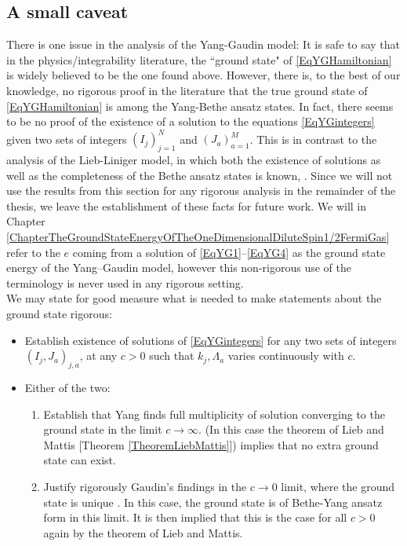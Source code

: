 \subsection{A small caveat}\label{SubsectionYGCaveat}
There is one issue in the analysis of the Yang-Gaudin model: It is safe to say that in the physics/integrability literature, the ``ground state" of \eqref{EqYGHamiltonian} is widely believed to be the one found above. However, there is, to the best of our knowledge, no rigorous proof in the literature that the true ground state of \eqref{EqYGHamiltonian} is among the Yang-Bethe ansatz states. In fact, there seems to be no proof of the existence of a solution to the equations \eqref{EqYGintegers} given two sets of integers $ (I_j)_{j=1}^{N} $ and $ (J_a)_{a=1}^{M} $. This is in contrast to the analysis of the Lieb-Liniger model, in which both the existence of solutions as well as the completeness of the Bethe ansatz states is known, \cite{cmp/1104252974}. Since we will not use the results from this section for any rigorous analysis in the remainder of the thesis, we leave the establishment of these facts for future work. We will in Chapter \ref{ChapterTheGroundStateEnergyOfTheOneDimensionalDiluteSpin1/2FermiGas} refer to the $ e $ coming from a solution of \eqref{EqYG1}--\eqref{EqYG4} as the ground state energy of the Yang--Gaudin model, however this non-rigorous use of the terminology is never used in any rigorous setting.\\
We may state for good measure what is needed to make statements about the ground state rigorous:
\begin{itemize}
	\item Establish existence of solutions of \eqref{EqYGintegers} for any two sets of integers $ (I_j,J_a)_{j,a} $, at any $ c>0 $ such that $ k_j,\Lambda_a $ varies continuously with $ c $.
	\item Either of the two: \begin{enumerate}
		\item Establish that Yang finds full multiplicity of solution converging to the ground state in the limit $ c\to\infty $. (In this case the theorem of Lieb and Mattis [Theorem \ref{TheoremLiebMattis}]) implies that no extra ground state can exist.
		\item Justify rigorously Gaudin's findings in the $ c\to 0 $ limit, where the ground state is unique \cite{gaudin1967systeme}. In this case, the ground state is of Bethe-Yang ansatz form in this limit. It is then implied that this is the case for all $ c>0 $ again by the theorem of Lieb and Mattis.
	\end{enumerate}
\end{itemize}










